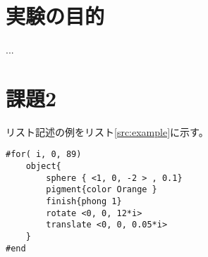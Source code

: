 \documentclass[a4j,dvipdfmx,uplatex,11pt]{jsarticle}
\author{情報　太郎} %
\begin{document}
 \maketitle
 

\tableofcontents 
 
\newpage 

\section{実験の目的}

...


\section{課題2}


リスト記述の例をリスト\ref{src:example}に示す。

\begin{lstlisting}[style=pov,mathescape=true,caption={POV-Rayコードの例}, label={src:example}]
#for( i, 0, 89)
    object{
        sphere { <1, 0, -2 > , 0.1}
        pigment{color Orange }
        finish{phong 1}
        rotate <0, 0, 12*i>
        translate <0, 0, 0.05*i>
    }
#end
\end{lstlisting}


 
\end{document}
